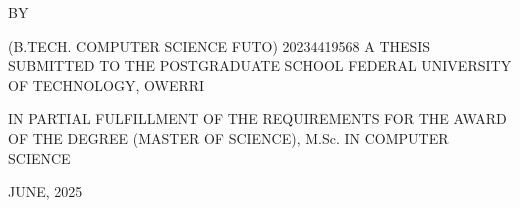 
{\centering \bfseries \Large \MakeUppercase{\topic}
	
\vspace{1cm}

BY

\MakeUppercase{\authorname}

(B.TECH. COMPUTER SCIENCE FUTO)
\newline \hspace*{3cm}20234419568
\vspace{2cm} \newline
A THESIS SUBMITTED TO THE POSTGRADUATE SCHOOL
FEDERAL UNIVERSITY OF TECHNOLOGY, OWERRI
\vspace{2cm}

IN PARTIAL FULFILLMENT OF THE REQUIREMENTS FOR 
THE AWARD OF THE DEGREE (MASTER OF SCIENCE), M.Sc. IN COMPUTER SCIENCE

\vspace{2cm}
\date{Date: }JUNE, 2025

}